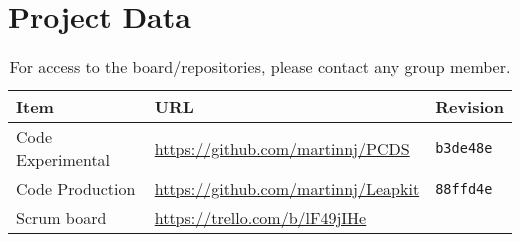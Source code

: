 \section{Project Data}
\begin{table}[h!]
    \begin{tabular}{l|l|l}
        \textbf{Item}            & \textbf{URL}                              & \textbf{Revision}\\\hline
        Code Experimental & \url{https://github.com/martinnj/PCDS}    & \texttt{b3de48e}\\
        Code Production   & \url{https://github.com/martinnj/Leapkit} & \texttt{88ffd4e}\\
        Scrum board       & \url{https://trello.com/b/lF49jIHe}       & \texttt{}
    \end{tabular}
    \label{tab:projdata}
    \caption{For access to the board/repositories, please contact any group member.}
\end{table}

